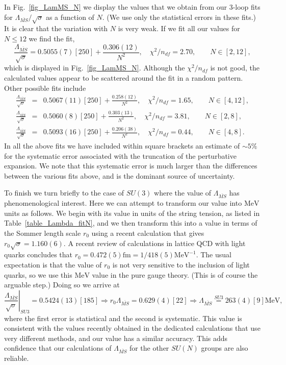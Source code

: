 \documentclass[12pt]{article}
\newcommand{\be}{\begin{equation}}
\newcommand{\ee}{\end{equation}}
\newcommand{\beq}{\begin{eqnarray}}
\newcommand{\eeq}{\end{eqnarray}}
\begin{document}
In Fig.~\ref{fig_LamMS_N} we display the values that we obtain from our 3-loop fits for
$\Lambda_{\overline{MS}}/\surd\sigma$ as a function of $N$. (We use only the statistical
errors in these fits.) It is clear that the variation
with $N$ is very weak. If we fit all our values for $N \leq 12$ we find the fit,
%
\be
\frac{\Lambda_{\overline{MS}}}{\surd\sigma}
  = 
  0.5055(7)[250] + \frac{0.306(12)}{N^2}, \quad \chi^2/n_{df}=2.70, \qquad N\in[2,12],  
\label{eqn_LamMS_N}
\ee
%
which is displayed in Fig.~\ref{fig_LamMS_N}. Although the $\chi^2/n_{df}$ is not good,
the calculated values appear to be scattered around the fit in a random pattern.
Other possible fits include
\beq
\frac{\Lambda_{\overline{MS}}}{\surd\sigma}
  & = &
  0.5067(11)[250] + \frac{0.258(12)}{N^2}, \quad \chi^2/n_{df}=1.65, \qquad N\in[4,12], \nonumber \\
\frac{\Lambda_{\overline{MS}}}{\surd\sigma}
  & = &
  0.5060(8)[250] + \frac{0.303(13)}{N^2}, \quad \chi^2/n_{df}=3.81, \qquad N\in[2,8], \nonumber \\
\frac{\Lambda_{\overline{MS}}}{\surd\sigma}
  & = &
  0.5093(16)[250] + \frac{0.206(38)}{N^2}, \quad \chi^2/n_{df}=0.44, \qquad N\in[4,8].
\label{eqn_LamMS_N_B}
\eeq
%
In all the above fits we have included within square brackets an estimate of $\sim 5\%$ for
the systematic error associated with the truncation of the perturbative expansion. We note
that this systematic error is much larger than the differences between the various fits above,
and is the dominant source of uncertainty.

To finish we turn briefly to the case of $SU(3)$ where the value of  $\Lambda_{\overline{MS}}$
has phenomenological interest. Here we can attempt to transform our value into $\mathrm{MeV}$
units as follows. We begin with its value in units of the string tension, as listed in
Table~\ref{table_Lambda_fitN}, and we then transform this into a value in terms of the Sommer
length scale $r_0$
%
\cite{Sommer-r0}
%
using a recent calculation
%
\cite{AAMT-2020}
%
that gives $r_0\surd\sigma = 1.160(6)$. A recent review
%
\cite{Sommer-r0b}
%
of calculations in lattice QCD with light quarks concludes that
$r_0=0.472(5)\mathrm{fm}=1/418(5) \mathrm{MeV}^{-1}$.
The usual expectation is that the value of $r_0$ is not very sensitive to the inclusion of light
quarks, so we use this $\mathrm{MeV}$ value in the pure gauge theory. (This is of course the
arguable step.) Doing so we arrive at
%
\be
\left.\frac{\Lambda_{\overline{MS}}}{\surd\sigma}\right|_{SU3}
= 0.5424(13)[185]
\Longrightarrow
r_0 \Lambda_{\overline{MS}} = 0.629(4)[22]
\Longrightarrow
\Lambda_{\overline{MS}} \stackrel{SU3}{=} 263(4)[9] \mathrm{MeV},
\label{eqn_LamMS_SU3}
\ee
%
where the first error is statistical and the second is systematic.
This value is consistent with the values recently obtained in the dedicated calculations
%
\cite{LamMS_SU3a,LamMS_SU3b}
%
that use very different methods, and our value has a similar accuracy. This adds
confidence that our calculations of $\Lambda_{\overline{MS}}$ for the other $SU(N)$
groups are also reliable.
\end{document}
